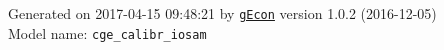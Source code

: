 \documentclass[10pt,a4paper]{article}
\numberwithin{equation}{section}
\begin{document}
\begin{flushleft}{\large
Generated  on 2017-04-15 09:48:21 by \href{http://gecon.r-forge.r-project.org/}{\texttt{gEcon}} version 1.0.2 (2016-12-05)\\
Model name: \verb+cge_calibr_iosam+
}\end{flushleft}



\end{document}
